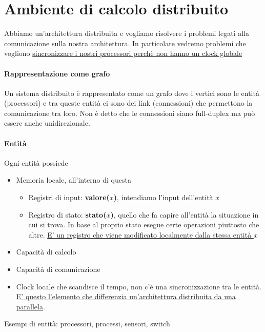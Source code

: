 \section{Ambiente di calcolo distribuito}
Abbiamo un'architettura distribuita e vogliamo risolvere i problemi legati alla comunicazione sulla nostra architettura. In particolare vedremo problemi che vogliono \uline{sincronizzare i nostri processori perchè non hanno un clock globale}

\paragraph{Rappresentazione come grafo}
Un sistema distribuito è rappresentato come un grafo dove i vertici sono le entità (processori) e tra queste entità ci sono dei link (connessioni) che permettono la comunicazione tra loro. Non è detto che le connessioni siano full-duplex ma può essere anche unidirezionale.

\paragraph{Entità}
Ogni entità possiede 
\begin{itemize}
    \item Memoria locale, all'interno di questa
    \begin{itemize}
        \item Registri di input: \textbf{valore($x$)}, intendiamo l'input dell'entità $x$
        \item Registro di stato: \textbf{stato($x$)}, quello che fa capire all'entità la situazione in cui si trova. In base al proprio stato esegue certe operazioni piuttosto che altre. \uline{E' un registro che viene modificato localmente dalla stessa entità $x$}
    \end{itemize}
    \item Capacità di calcolo
    \item Capacità di comunicazione
    \item Clock locale che scandisce il tempo, non c'è una sincronizzazione tra le entità.\uline{ E' questo l'elemento che differenzia un'architettura distribuita da una parallela}.
\end{itemize}

Esempi di entità: processori, processi, sensori, switch

